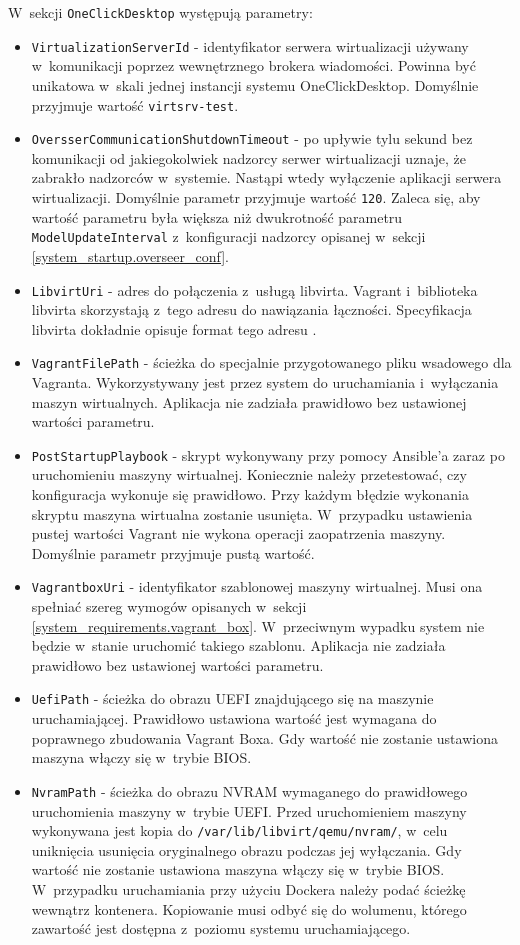 \documentclass[../opis-rozwiazania.tex]{subfiles}
\begin{document}
W~sekcji \texttt{OneClickDesktop} występują parametry:
\begin{itemize}
  \item \texttt{VirtualizationServerId} - identyfikator serwera wirtualizacji używany w~komunikacji poprzez wewnętrznego brokera wiadomości. Powinna być unikatowa w~skali jednej instancji systemu OneClickDesktop. Domyślnie przyjmuje wartość \texttt{virtsrv-test}.
  \item \texttt{OversserCommunicationShutdownTimeout} - po upływie tylu sekund bez komunikacji od jakiegokolwiek nadzorcy serwer wirtualizacji uznaje, że zabrakło nadzorców w~systemie. Nastąpi wtedy wyłączenie aplikacji serwera wirtualizacji. Domyślnie parametr przyjmuje wartość \texttt{120}. Zaleca się, aby wartość parametru była większa niż dwukrotność parametru \texttt{ModelUpdateInterval} z~konfiguracji nadzorcy opisanej w~sekcji \ref{system_startup.overseer_conf}.
  \item \texttt{LibvirtUri} - adres do połączenia z~usługą libvirta. Vagrant i~biblioteka libvirta skorzystają z~tego adresu do nawiązania łączności. Specyfikacja libvirta dokładnie opisuje format tego adresu \parencite{libvirt-uri}.
  \item \texttt{VagrantFilePath} - ścieżka do specjalnie przygotowanego pliku wsadowego dla Vagranta. Wykorzystywany jest przez system do uruchamiania i~wyłączania maszyn wirtualnych. Aplikacja nie zadziała prawidłowo bez ustawionej wartości parametru.
  \item \texttt{PostStartupPlaybook} - skrypt wykonywany przy pomocy Ansible'a zaraz po uruchomieniu maszyny wirtualnej. Koniecznie należy przetestować, czy konfiguracja wykonuje się prawidłowo. Przy każdym błędzie wykonania skryptu maszyna wirtualna zostanie usunięta. W~przypadku ustawienia pustej wartości Vagrant nie wykona operacji zaopatrzenia maszyny. Domyślnie parametr przyjmuje pustą wartość.
  \item \texttt{VagrantboxUri} - identyfikator szablonowej maszyny wirtualnej. Musi ona spełniać szereg wymogów opisanych w~sekcji \ref{system_requirements.vagrant_box}. W~przeciwnym wypadku system nie będzie w~stanie uruchomić takiego szablonu. Aplikacja nie zadziała prawidłowo bez ustawionej wartości parametru.
  \item \texttt{UefiPath} - ścieżka do obrazu UEFI znajdującego się na maszynie uruchamiającej. Prawidłowo ustawiona wartość jest wymagana do poprawnego zbudowania Vagrant Boxa. Gdy wartość nie zostanie ustawiona maszyna włączy się w~trybie BIOS.
  \item \texttt{NvramPath} - ścieżka do obrazu NVRAM wymaganego do prawidłowego uruchomienia maszyny w~trybie UEFI. Przed uruchomieniem maszyny wykonywana jest kopia do \texttt{/var/lib/libvirt/qemu/nvram/}, w~celu uniknięcia usunięcia oryginalnego obrazu podczas jej wyłączania. Gdy wartość nie zostanie ustawiona maszyna włączy się w~trybie BIOS. W~przypadku uruchamiania przy użyciu Dockera należy podać ścieżkę wewnątrz kontenera. Kopiowanie musi odbyć się do wolumenu, którego zawartość jest dostępna z~poziomu systemu uruchamiającego.

\end{itemize}
\end{document}

